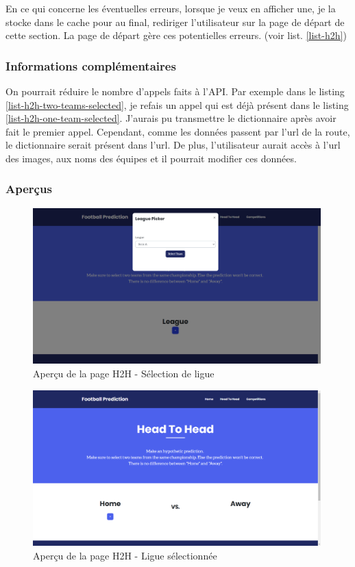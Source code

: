 \documentclass[a4paper,14pt]{extarticle}
\begin{document}
{

En ce qui concerne les éventuelles erreurs, lorsque je veux en afficher une, je la stocke dans le cache pour au final, rediriger l'utilisateur sur la page de départ de cette section. La page de départ gère ces potentielles erreurs. (voir list. \ref{list-h2h})


\subsubsection{Informations complémentaires}
On pourrait réduire le nombre d'appels faits à l'API. Par exemple dans le listing \ref{list-h2h-two-teams-selected}, je refais un appel qui est déjà présent dans le listing \ref{list-h2h-one-team-selected}. J'aurais pu transmettre le dictionnaire après avoir fait le premier appel. Cependant, comme les données passent par l'url de la route, le dictionnaire serait présent dans l'url. De plus, l'utilisateur aurait accès à l'url des images, aux noms des équipes et il pourrait modifier ces données.

\subsubsection{Aperçus}

\begin{figure}[htp]
    \centering
    \includegraphics[width=30em]{../img/leaguePickerH2H.png}
    \caption{Aperçu de la page H2H - Sélection de ligue}
    \label{fig:leaguePickerH2H}
\end{figure}

\begin{figure}[htp]
    \centering
    \includegraphics[width=30em]{../img/leagueSelectedH2H.png}
    \caption{Aperçu de la page H2H - Ligue sélectionnée}
    \label{fig:leagueSelectedH2H}
\end{figure}

}
\end{document}
